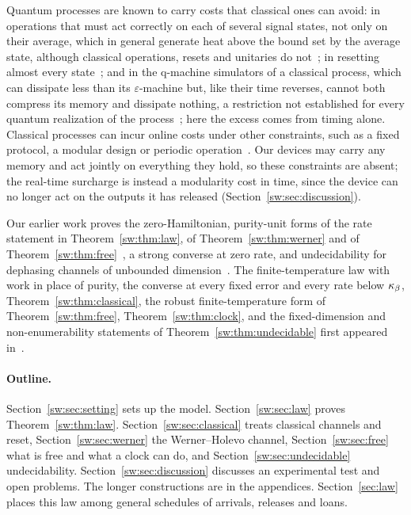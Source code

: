 Quantum processes are known to carry costs that classical ones can avoid: in operations that must act correctly on each of several signal states, not only on their average, which in general generate heat above the bound set by the average state, although classical operations, resets and unitaries do not~\cite{BedinghamMaroney}; in resetting almost every state~\cite{RiechersGu21}; and in the q-machine simulators of a classical process, which can dissipate less than its $\varepsilon$-machine but, like their time reverses, cannot both compress its memory and dissipate nothing, a restriction not established for every quantum realization of the process~\cite{LoomisCrutchfield20,LoomisCrutchfield20PRL}; here the excess comes from timing alone. Classical processes can incur online costs under other constraints, such as a fixed protocol, a modular design or periodic operation~\cite{KolchinskyWolpert21,BMC18,OuldridgeWolpert23}. Our devices may carry any memory and act jointly on everything they hold, so these constraints are absent; the real-time surcharge is instead a modularity cost in time, since the device can no longer act on the outputs it has released (Section~\ref{sw:sec:discussion}).

Our earlier work proves the zero-Hamiltonian, purity-unit forms of the rate statement in Theorem~\ref{sw:thm:law}, of Theorem~\ref{sw:thm:werner} and of Theorem~\ref{sw:thm:free}~\cite{Memory,ImmediateDelivery,Douglas26closed}, a strong converse at zero rate, and undecidability for dephasing channels of unbounded dimension~\cite{Flagship}. The finite-temperature law with work in place of purity, the converse at every fixed error and every rate below $\kappa_\beta$, Theorem~\ref{sw:thm:classical}, the robust finite-temperature form of Theorem~\ref{sw:thm:free}, Theorem~\ref{sw:thm:clock}, and the fixed-dimension and non-enumerability statements of Theorem~\ref{sw:thm:undecidable} first appeared in~\cite{SaveWork}.

\paragraph{Outline.} Section~\ref{sw:sec:setting} sets up the model. Section~\ref{sw:sec:law} proves Theorem~\ref{sw:thm:law}. Section~\ref{sw:sec:classical} treats classical channels and reset, Section~\ref{sw:sec:werner} the Werner--Holevo channel, Section~\ref{sw:sec:free} what is free and what a clock can do, and Section~\ref{sw:sec:undecidable} undecidability. Section~\ref{sw:sec:discussion} discusses an experimental test and open problems. The longer constructions are in the appendices. Section~\ref{sec:law} places this law among general schedules of arrivals, releases and loans.


